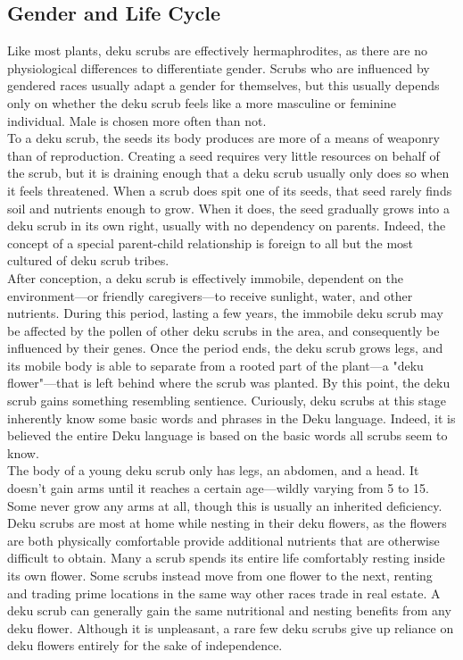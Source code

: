 \documentclass[10pt,twoside,twocolumn,openany]{book}
\begin{document}
\subsection{Gender and Life Cycle}
Like most plants, deku scrubs are effectively hermaphrodites, as there are no physiological differences to differentiate gender. Scrubs who are influenced by gendered races usually adapt a gender for themselves, but this usually depends only on whether the deku scrub feels like a more masculine or feminine individual. Male is chosen more often than not.\\
To a deku scrub, the seeds its body produces are more of a means of weaponry than of reproduction. Creating a seed requires very little resources on behalf of the scrub, but it is draining enough that a deku scrub usually only does so when it feels threatened. When a scrub does spit one of its seeds, that seed rarely finds soil and nutrients enough to grow. When it does, the seed gradually grows into a deku scrub in its own right, usually with no dependency on parents. Indeed, the concept of a special parent-child relationship is foreign to all but the most cultured of deku scrub tribes.\\
After conception, a deku scrub is effectively immobile, dependent on the environment—or friendly caregivers—to receive sunlight, water, and other nutrients. During this period, lasting a few years, the immobile deku scrub may be affected by the pollen of other deku scrubs in the area, and consequently be influenced by their genes. Once the period ends, the deku scrub grows legs, and its mobile body is able to separate from a rooted part of the plant—a "deku flower"—that is left behind where the scrub was planted. By this point, the deku scrub gains something resembling sentience. Curiously, deku scrubs at this stage inherently know some basic words and phrases in the Deku language. Indeed, it is believed the entire Deku language is based on the basic words all scrubs seem to know.\\
The body of a young deku scrub only has legs, an abdomen, and a head. It doesn't gain arms until it reaches a certain age—wildly varying from 5 to 15. Some never grow any arms at all, though this is usually an inherited deficiency.\\
Deku scrubs are most at home while nesting in their deku flowers, as the flowers are both physically comfortable provide additional nutrients that are otherwise difficult to obtain. Many a scrub spends its entire life comfortably resting inside its own flower. Some scrubs instead move from one flower to the next, renting and trading prime locations in the same way other races trade in real estate. A deku scrub can generally gain the same nutritional and nesting benefits from any deku flower. Although it is unpleasant, a rare few deku scrubs give up reliance on deku flowers entirely for the sake of independence.
\end{document}
